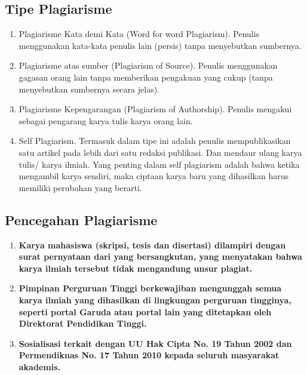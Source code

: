 \documentclass{article}
\begin{document}
\subsection{Tipe Plagiarisme}
\begin{enumerate}
    \item Plagiarisme Kata demi Kata (Word for word Plagiarism). Penulis menggunakan kata-kata penulis lain (persis) tanpa menyebutkan sumbernya.
    \item Plagiarisme atas sumber (Plagiarism of Source). Penulis menggunakan gagasan orang lain tanpa memberikan pengakuan yang cukup (tanpa menyebutkan sumbernya secara jelas).
    \item Plagiarisme Kepengarangan (Plagiarism of Authorship). Penulis mengakui sebagai pengarang karya tulis karya orang lain.
    \item Self Plagiarism. Termasuk dalam tipe ini adalah penulis mempublikasikan satu artikel pada lebih dari satu redaksi publikasi. Dan mendaur ulang karya tulis/ karya ilmiah. Yang penting dalam self plagiarism adalah bahwa ketika mengambil karya sendiri, maka ciptaan karya baru yang dihasilkan harus memiliki perubahan yang berarti.
\end{enumerate}

\subsection{Pencegahan Plagiarisme}
\begin{enumerate}
    \item \textbf{Karya mahasiswa (skripsi, tesis dan disertasi) dilampiri dengan surat pernyataan dari
    yang bersangkutan, yang menyatakan bahwa karya ilmiah tersebut tidak mengandung
    unsur plagiat.}
    \item \textbf{Pimpinan Perguruan Tinggi berkewajiban mengunggah semua karya ilmiah yang dihasilkan
    di lingkungan perguruan tingginya, seperti portal Garuda atau portal lain
    yang ditetapkan oleh Direktorat Pendidikan Tinggi.} 
    \item \textbf{Sosialisasi terkait dengan UU Hak Cipta No. 19 Tahun 2002 dan Permendiknas No. 17
    Tahun 2010 kepada seluruh masyarakat akademis.} 
\end{enumerate}
\end{document}
